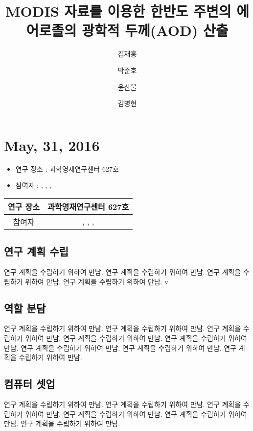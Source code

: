 \documentclass{research-note-v1.0}
\title{MODIS 자료를 이용한 한반도 주변의 에어로졸의 광학적 두께(AOD) 산출} %
\author[1] {김재홍} %
\author[2] {박준호} %
\author[3] {윤산울} %
\author[4] {김병현} %
\begin{document}
		
\section*{May, 31, 2016}

\begin{itemize}
	\item{연구 장소 : 과학영재연구센터 627호}
	\item{참여자 : {\@firstAuthor}, \@secondAuthor, \@thirdAuthor, \@fourthAuthor}
\end{itemize}


	

	\begin{table}[h]
		\label{table01}
		\begin{tabular}{|c|c|} 
			\hline
			연구 장소   &   과학영재연구센터 627호 \\ 
			\hline
			참여자   &   {\@firstAuthor}, \@secondAuthor, \@thirdAuthor, \@fourthAuthor  \\
			\hline
		\end{tabular}
	\end{table}

	\subsection*{연구 계획 수립}
							연구 계획을 수립하기 위하여 만남.
							연구 계획을 수립하기 위하여 만남.
								연구 계획을 수립하기 위하여 만남.
									연구 계획을 수립하기 위하여 만남.
									v
	
    \subsection*{역할 분담}
			연구 계획을 수립하기 위하여 만남.
				연구 계획을 수립하기 위하여 만남.
					연구 계획을 수립하기 위하여 만남.
						연구 계획을 수립하기 위하여 만남.
							연구 계획을 수립하기 위하여 만남.
								연구 계획을 수립하기 위하여 만남.
									연구 계획을 수립하기 위하여 만남.
										연구 계획을 수립하기 위하여 만남.
	\subsection*{컴퓨터 셋업}
		연구 계획을 수립하기 위하여 만남.
			연구 계획을 수립하기 위하여 만남.
				연구 계획을 수립하기 위하여 만남.
					연구 계획을 수립하기 위하여 만남.
						연구 계획을 수립하기 위하여 만남.
							연구 계획을 수립하기 위하여 만남.
\end{document}

